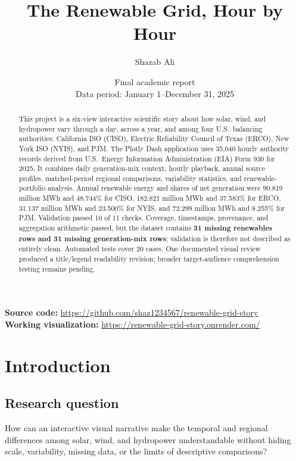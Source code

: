 \documentclass[11pt]{article}
\title{The Renewable Grid, Hour by Hour}
\author{Shazab Ali}
\date{Final academic report\\Data period: January 1--December 31, 2025}
\begin{document}
\maketitle

\begin{center}
\textbf{Source code:} \url{https://github.com/shaz1234567/renewable-grid-story}\\
\textbf{Working visualization:} \url{https://renewable-grid-story.onrender.com/}
\end{center}

\begin{abstract}
This project is a six-view interactive scientific story about how solar, wind, and hydropower vary through a day, across a year, and among four U.S.\ balancing authorities: California ISO (CISO), Electric Reliability Council of Texas (ERCO), New York ISO (NYIS), and PJM. The Plotly Dash application uses 35,040 hourly authority records derived from U.S.\ Energy Information Administration (EIA) Form 930 for 2025. It combines daily generation-mix context, hourly playback, annual source profiles, matched-period regional comparisons, variability statistics, and renewable-portfolio analysis. Annual renewable energy and shares of net generation were 90.819 million MWh and 48.744\% for CISO, 182.821 million MWh and 37.583\% for ERCO, 31.137 million MWh and 23.500\% for NYIS, and 72.299 million MWh and 8.255\% for PJM. Validation passed 10 of 11 checks. Coverage, timestamps, provenance, and aggregation arithmetic passed, but the dataset contains \textbf{31 missing renewables rows and 31 missing generation-mix rows}; validation is therefore not described as entirely clean. Automated tests cover 20 cases. One documented visual review produced a title/legend readability revision; broader target-audience comprehension testing remains pending.
\end{abstract}

\section{Introduction}
\subsection{Research question}
How can an interactive visual narrative make the temporal and regional differences among solar, wind, and hydropower understandable without hiding scale, variability, missing data, or the limits of descriptive comparisons?
\end{document}
